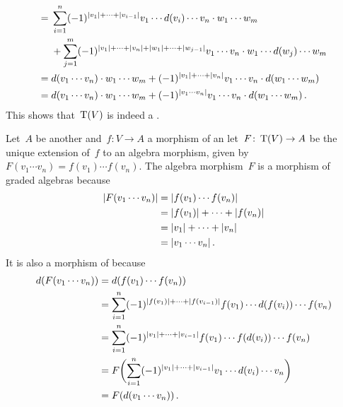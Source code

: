 \documentclass[a4paper,10pt,headings=standardclasses]{scrartcl}
\begin{document}
\begin{enumerate}[start=2]
\begin{gather*}
\begin{aligned}
        ={}&
        \sum_{i=1}^n
        (-1)^{\lvert v_1\rvert + \dotsb + \lvert v_{i-1}\rvert}
        v_1 \dotsm d(v_i) \dotsm v_n \cdot w_1 \dotsm w_m
        \\
        {}&
        +
        \sum_{j=1}^m
        (-1)^{\lvert v_1\rvert + \dotsb + \lvert v_n\rvert + \lvert w_1\rvert + \dotsb + \lvert w_{j-1}\rvert}
        v_1 \dotsm v_n \cdot w_1 \dotsm d(w_j) \dotsm w_m
        \\
        ={}&
        d(v_1 \dotsm v_n) \cdot w_1 \dotsm w_m
        +
        (-1)^{\lvert v_1\rvert + \dotsb + \lvert v_n\rvert}
        v_1 \dotsm v_n \cdot d(w_1 \dotsm w_m)
        \\
        ={}&
        d(v_1 \dotsm v_n) \cdot w_1 \dotsm w_m
        +
        (-1)^{\lvert v_1 \dotsm v_n\rvert}
        v_1 \dotsm v_n \cdot d(w_1 \dotsm w_m) \,.
      \end{aligned}
    \end{gather*}
    This shows that~$\operatorname{T}(V)$ is indeed a {\dga}.
    
    Let~$A$ be another {\dga} and~$f \colon V \to A$ a morphism of {\dgvs} an let~$F \colon \operatorname{T}(V) \to A$ be the unique extension of~$f$ to an algebra morphism, given by~$F(v_1 \dotsm v_n) = f(v_1) \dotsm f(v_n)$.
    The algebra morphism~$F$ is a morphism of graded algebras because
    \begin{align*}
      \lvert F(v_1 \dotsm v_n)\rvert
      &=
      \lvert f(v_1) \dotsm f(v_n)\rvert
      \\
      &=
      \lvert f(v_1)\rvert + \dotsb + \lvert f(v_n)\rvert
      \\
      &=
      \lvert v_1\rvert + \dotsb + \lvert v_n\rvert
      \\
      &=
      \lvert v_1 \dotsm v_n\rvert \,.
    \end{align*}
    It is also a morphism of {\dgvs} because
    \begin{align*}
      d(F(v_1 \dotsm v_n))
      &=
      d( f(v_1) \dotsm f(v_n) )
      \\
      &=
      \sum_{i=1}^n
      (-1)^{\lvert f(v_1)\rvert + \dotsb + \lvert f(v_{i-1})\rvert }
      f(v_1) \dotsm d(f(v_i)) \dotsm f(v_n)
      \\
      &=
      \sum_{i=1}^n
      (-1)^{\lvert v_1\rvert + \dotsb + \lvert v_{i-1}\rvert }
      f(v_1) \dotsm f(d(v_i)) \dotsm f(v_n)
      \\
      &=
      F\biggl(
        \sum_{i=1}^n
        (-1)^{\lvert v_1\rvert + \dotsb + \lvert v_{i-1}\rvert }
        v_1 \dotsm d(v_i) \dotsm v_n
      \biggr)
      \\
      &=
      F(d(v_1 \dotsm v_n)) \,.
    \end{align*}

\end{enumerate}
\end{document}
